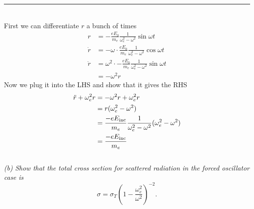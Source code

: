 \documentclass[12pt, letterpaper, twoside]{article}
\newcommand{\answer}[1]{
    \par\noindent\rule{\textwidth}{0.4pt}\\#1\\
}
\begin{document}
\answer{
    First we can differentiate $r$ a bunch of times
    \begin{align}
        r &= -\frac{e E_0}{m_e} \frac{1}{\omega_e^2 - \omega^2} \sin \omega t \\
        \dot{r} &= - \omega \cdot \frac{e E_0}{m_e} \frac{1}{\omega_e^2 - \omega^2} \cos \omega t \\
        \ddot{r} &= \omega^2 \cdot - \frac{e E_0}{m_e} \frac{1}{\omega_e^2 - \omega^2} \sin \omega t \\
        &= - \omega^2 r
    \end{align}
    Now we plug it into the LHS and show that it gives the RHS
    \begin{align}
        \ddot{r} + \omega_e^2 r &= -\omega^2 r + \omega_e^2 r \\
        &= r (\omega_e^2 - \omega^2) \\
        &= \frac{-e E_{\rm inc}}{m_e} \frac{1}{\omega_e^2 - \omega^2} (\omega_e^2 - \omega^2) \\
        &= \frac{-e E_{\rm inc}}{m_e}
    \end{align}
}

{\it \noindent 
(b) Show that the total cross section for scattered radiation
in the forced oscillator case is 
\begin{equation}
\sigma = \sigma_T \left(1-\frac{\omega_e^2}{\omega^2} \right)^{-2}.
\end{equation}}
\end{document}
